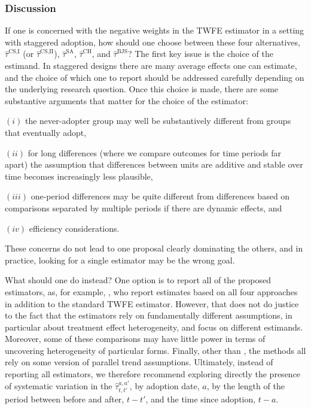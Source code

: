 \documentclass[letterpaper,12pt,leqno]{article}
\begin{document}
\subsubsection{Discussion}

If one is concerned with the negative weights in the TWFE estimator in a setting with staggered adoption, how should one choose between these four alternatives, 
$\hat\tau^{\textrm{CS,I}}$ (or $\hat\tau^{\textrm{CS,II}}$), $\hat\tau^{\textrm{SA}}$, 
$\hat\tau^{\textrm{CH}}$, and $\hat\tau^\mathrm{BJS}$? The first key issue is the choice of the estimand. In staggered designs there are many average effects one can estimate, and the choice of which one to report should be addressed carefully depending on the underlying research question. Once this choice is made, there are some substantive arguments that matter for the choice of the estimator: \begin{inparadesc}\item[$(i)$] the never-adopter group may well be substantively different from groups that eventually adopt, \item[$(ii)$] for long differences (where we compare outcomes for time periods far apart) the assumption that differences between units are additive and stable over time becomes increasingly less plausible, \item[$(iii)$] one-period differences may be quite different from differences based on comparisons separated by multiple periods if there are dynamic effects, and \item[$(iv)$] efficiency considerations.
\end{inparadesc}
These concerns do not lead to one proposal clearly dominating the others, and in practice, looking for a single estimator may be the wrong goal. 


What should one do instead? One option is to report all of the proposed estimators, as, for example, \citep{braghieri2022social}, who report estimates based on all four approaches in addition to the standard TWFE estimator.
However, that does not do justice to the fact that the estimators rely on fundamentally different assumptions, in particular about treatment effect heterogeneity, and focus on different estimands. Moreover, some of these comparisons may have little power in terms of uncovering heterogeneity of particular forms. Finally, other than \citep{borusyak2021revisiting}, the methods all rely on some version of parallel trend assumptions. Ultimately, instead of reporting all estimators, we therefore recommend exploring directly the presence of systematic variation in the $\hat\tau_{t,t'}^{a,a'}$, by adoption date, $a$, by the length of the period between before and after, $t-t'$, and the time since adoption, $t-a$.  
\end{document}
